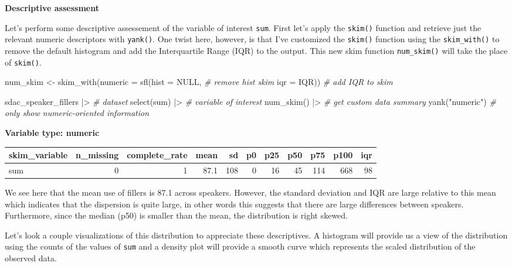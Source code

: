 \documentclass[
  letterpaper,
]{latex/krantz}
\newenvironment{Shaded}{\begin{snugshade}}{\end{snugshade}}
\newcommand{\AttributeTok}[1]{\textcolor[rgb]{0.00,0.00,0.00}{#1}}
\newcommand{\CommentTok}[1]{\textcolor[rgb]{0.00,0.00,0.00}{\textit{#1}}}
\newcommand{\ConstantTok}[1]{\textcolor[rgb]{0.00,0.00,0.00}{#1}}
\newcommand{\FunctionTok}[1]{\textcolor[rgb]{0.00,0.00,0.00}{#1}}
\newcommand{\NormalTok}[1]{\textcolor[rgb]{0.00,0.00,0.00}{#1}}
\newcommand{\OtherTok}[1]{\textcolor[rgb]{0.00,0.00,0.00}{#1}}
\newcommand{\SpecialCharTok}[1]{\textcolor[rgb]{0.00,0.00,0.00}{#1}}
\newcommand{\StringTok}[1]{\textcolor[rgb]{0.00,0.00,0.00}{#1}}
\begin{document}
\textbf{Descriptive assessment}

Let's perform some descriptive assessement of the variable of interest
\texttt{sum}. First let's apply the \texttt{skim()} function and
retrieve just the relevant numeric descriptors with \texttt{yank()}. One
twist here, however, is that I've customized the \texttt{skim()}
function using the \texttt{skim\_with()} to remove the default histogram
and add the Interquartile Range (IQR) to the output. This new skim
function \texttt{num\_skim()} will take the place of \texttt{skim()}.

\begin{Shaded}
\begin{Highlighting}[]
\NormalTok{num\_skim }\OtherTok{\textless{}{-}} 
  \FunctionTok{skim\_with}\NormalTok{(}\AttributeTok{numeric =} \FunctionTok{sfl}\NormalTok{(}\AttributeTok{hist =} \ConstantTok{NULL}\NormalTok{, }\CommentTok{\# remove hist skim}
                                   \AttributeTok{iqr =}\NormalTok{ IQR)) }\CommentTok{\# add IQR to skim}

\NormalTok{sdac\_speaker\_fillers }\SpecialCharTok{|\textgreater{}} \CommentTok{\# dataset}
  \FunctionTok{select}\NormalTok{(sum) }\SpecialCharTok{|\textgreater{}} \CommentTok{\# variable of interest}
  \FunctionTok{num\_skim}\NormalTok{() }\SpecialCharTok{|\textgreater{}} \CommentTok{\# get custom data summary}
  \FunctionTok{yank}\NormalTok{(}\StringTok{"numeric"}\NormalTok{) }\CommentTok{\# only show numeric{-}oriented information}
\end{Highlighting}
\end{Shaded}

\textbf{Variable type: numeric}

\begin{tabular}{l|r|r|r|r|r|r|r|r|r|r}
\hline
skim\_variable & n\_missing & complete\_rate & mean & sd & p0 & p25 & p50 & p75 & p100 & iqr\\
\hline
sum & 0 & 1 & 87.1 & 108 & 0 & 16 & 45 & 114 & 668 & 98\\
\hline
\end{tabular}

We see here that the mean use of fillers is 87.1 across speakers.
However, the standard deviation and IQR are large relative to this mean
which indicates that the dispersion is quite large, in other words this
suggests that there are large differences between speakers. Furthermore,
since the median (p50) is smaller than the mean, the distribution is
right skewed.

Let's look a couple visualizations of this distribution to appreciate
these descriptives. A histogram will provide us a view of the
distribution using the counts of the values of \texttt{sum} and a
density plot will provide a smooth curve which represents the scaled
distribution of the observed data.
\end{document}
